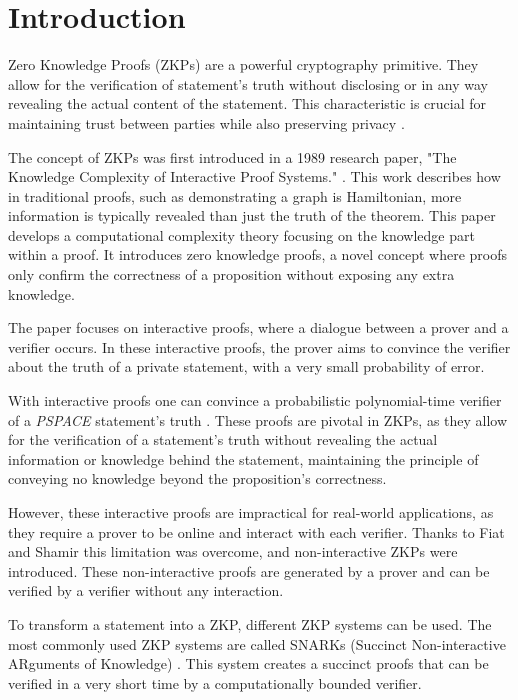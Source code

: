 \chapter{Introduction}

Zero Knowledge Proofs (ZKPs) are a powerful cryptography primitive. They allow
for the verification of statement's truth without disclosing or in any way revealing
the actual content of the statement. This characteristic is crucial for
maintaining trust between parties while also preserving privacy \cite{goldreich1991proofs}.

The concept of ZKPs was first introduced in a 1989 research paper, "The
Knowledge Complexity of Interactive Proof Systems." \cite{Goldwasser1989}.
This work describes how in traditional proofs, such as demonstrating a graph
is Hamiltonian, more information is typically revealed than just the truth of
the theorem. This paper develops a computational complexity theory focusing
on the knowledge part within a proof. It introduces zero knowledge proofs,
a novel concept where proofs only confirm the correctness of a proposition
without exposing any extra knowledge.

The paper focuses on interactive proofs, where a dialogue between a prover and
a verifier occurs. In these interactive proofs, the prover aims to convince
the verifier about the truth of a private statement, with a very small
probability of error.

With interactive proofs one can convince a probabilistic polynomial-time verifier
of a \emph{PSPACE} statement's truth \cite{Shamir1992, Lund1992}. These proofs
are pivotal in ZKPs, as they allow for the verification of a statement's truth
without revealing the actual information or knowledge behind the statement,
maintaining the principle of conveying no knowledge beyond the proposition's
correctness.

However, these interactive proofs are impractical for real-world applications, as they
require a prover to be online and interact with each verifier. Thanks to Fiat
and Shamir \cite{Fiat} this limitation was overcome, and non-interactive
ZKPs were introduced. These non-interactive proofs are
generated by a prover and can be verified by a verifier without any
interaction.

To transform a statement into a ZKP, different ZKP systems can be used. The most
commonly used ZKP systems are called SNARKs (Succinct Non-interactive ARguments
of Knowledge) \cite{Groth16}. This system creates a succinct proofs that can be
verified in a very short time by a computationally bounded verifier.

